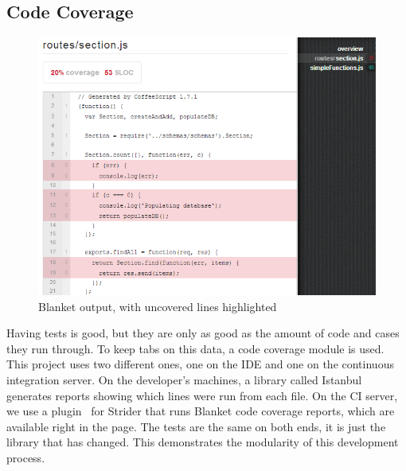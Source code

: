 \documentclass[12pt]{article}
\begin{document}
\subsection{Code Coverage}\label{sec:coverage}
\begin{figure}[h!]
\includegraphics[width=\linewidth]{img/strider_3.png}
\caption{Blanket output, with uncovered lines highlighted}
\end{figure}
Having tests is good, but they are only as good as the amount of code and cases they run through. To keep tabs on this data, a code coverage module is used. This project uses two different ones, one on the IDE and one on the continuous integration server. On the developer's machines, a library called Istanbul~\cite{Istanbul} generates reports showing which lines were run from each file. On the CI server, we use a plugin~\cite{Blanket} for Strider that runs Blanket code coverage reports, which are available right in the page. The tests are the same on both ends, it is just the library that has changed. This demonstrates the modularity of this development process.
\end{document}

